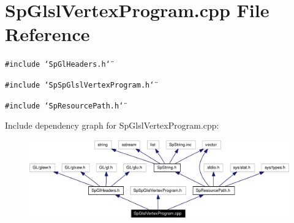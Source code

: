 \section{Sp\-Glsl\-Vertex\-Program.cpp File Reference}
\label{SpGlslVertexProgram_8cpp}
{\tt \#include \char`\"{}Sp\-Gl\-Headers.h\char`\"{}}\par
{\tt \#include \char`\"{}Sp\-Sp\-Glsl\-Vertex\-Program.h\char`\"{}}\par
{\tt \#include \char`\"{}Sp\-Resource\-Path.h\char`\"{}}\par


Include dependency graph for Sp\-Glsl\-Vertex\-Program.cpp:\begin{figure}[H]
\begin{center}
\leavevmode
\includegraphics[width=333pt]{SpGlslVertexProgram_8cpp__incl}
\end{center}
\end{figure}
